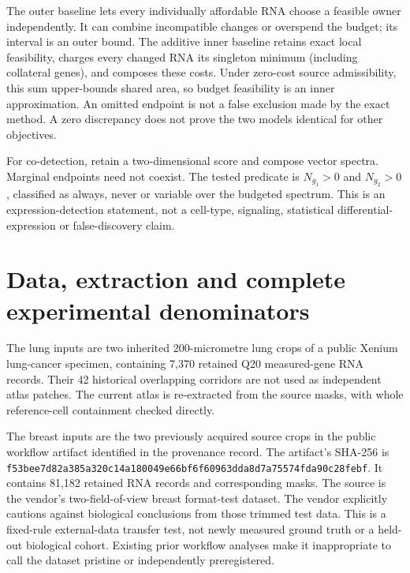 \documentclass[10pt,letterpaper]{article}
\begin{document}
The outer baseline lets every individually affordable RNA choose a feasible owner independently. It can combine incompatible changes or overspend the budget; its interval is an outer bound. The additive inner baseline retains exact local feasibility, charges every changed RNA its singleton minimum (including collateral genes), and composes these costs. Under zero-cost source admissibility, this sum upper-bounds shared area, so budget feasibility is an inner approximation. An omitted endpoint is not a false exclusion made by the exact method. A zero discrepancy does not prove the two models identical for other objectives.

For co-detection, retain a two-dimensional score and compose vector spectra. Marginal endpoints need not coexist. The tested predicate is $N_{g_1}>0$ and $N_{g_2}>0$, classified as always, never or variable over the budgeted spectrum. This is an expression-detection statement, not a cell-type, signaling, statistical differential-expression or false-discovery claim.

\section{Data, extraction and complete experimental denominators}
The lung inputs are two inherited 200-micrometre lung crops of a public Xenium lung-cancer specimen, containing 7,370 retained Q20 measured-gene RNA records. Their 42 historical overlapping corridors are not used as independent atlas patches. The current atlas is re-extracted from the source masks, with whole reference-cell containment checked directly.

The breast inputs are the two previously acquired source crops in the public workflow artifact identified in the provenance record. The artifact's SHA-256 is \nolinkurl{f53bee7d82a385a320c14a180049e66bf6f60963dda8d7a75574fda90c28febf}. It contains 81,182 retained RNA records and corresponding masks. The source is the vendor's two-field-of-view breast format-test dataset. The vendor explicitly cautions against biological conclusions from those trimmed test data. This is a fixed-rule external-data transfer test, not newly measured ground truth or a held-out biological cohort. Existing prior workflow analyses make it inappropriate to call the dataset pristine or independently preregistered.
\end{document}
